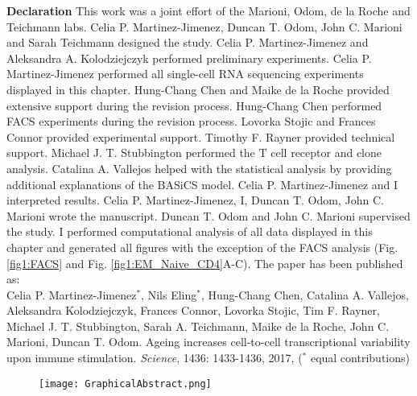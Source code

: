 \begin{Comment}
\textbf{Declaration} This work was a joint effort of the Marioni, Odom, de la Roche and Teichmann labs. Celia P. Martinez-Jimenez, Duncan T. Odom, John C. Marioni and Sarah Teichmann designed the study. Celia P. Martinez-Jimenez and Aleksandra A. Kolodziejczyk performed preliminary experiments. Celia P. Martinez-Jimenez performed all single-cell RNA sequencing experiments displayed in this chapter. Hung-Chang Chen and Maike de la Roche provided extensive support during the revision process. Hung-Chang Chen performed FACS experiments during the revision process. Lovorka Stojic and Frances Connor provided experimental support. Timothy F. Rayner provided technical support. Michael J. T. Stubbington performed the T cell receptor and clone analysis. Catalina A. Vallejos helped with the statistical analysis by providing additional explanations of the BASiCS model. Celia P. Martinez-Jimenez and I interpreted results. Celia P. Martinez-Jimenez, I, Duncan T. Odom, John C. Marioni wrote the manuscript. Duncan T. Odom and John C. Marioni supervised the study. I performed computational analysis of all data displayed in this chapter and generated all figures with the exception of the FACS analysis (Fig. \ref{fig1:FACS} and Fig. \ref{fig1:EM_Naive_CD4}A-C). The paper has been published as:\\

Celia P. Martinez-Jimenez$^\ast$, Nils  Eling$^\ast$, Hung-Chang Chen, Catalina A. Vallejos, Aleksandra Kolodziejczyk, Frances Connor, Lovorka Stojic, Tim F. Rayner, Michael J. T. Stubbington, Sarah A. Teichmann, Maike de la Roche, John C. Marioni, Duncan T. Odom. Ageing increases cell-to-cell transcriptional variability upon immune stimulation. \emph{Science}, 1436: 1433-1436, 2017, ($^\ast$ equal contributions)
\end{Comment}

\begin{figure}[hb]
\centering    
\texttt{[image: GraphicalAbstract.png]}
\end{figure}

\newpage


\newpage

\newpage

